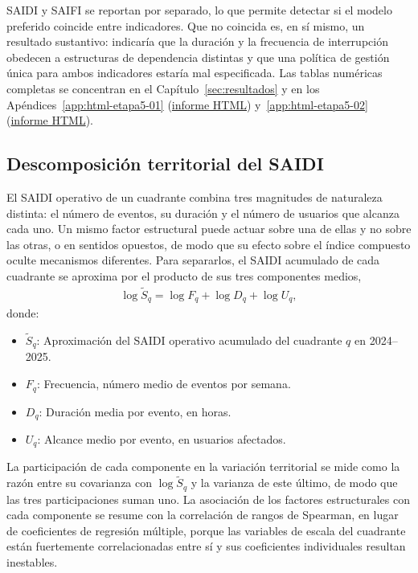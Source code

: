 SAIDI y SAIFI se reportan por separado, lo que permite detectar si el modelo preferido coincide entre indicadores. Que no coincida es, en sí mismo, un resultado sustantivo: indicaría que la duración y la frecuencia de interrupción obedecen a estructuras de dependencia distintas y que una política de gestión única para ambos indicadores estaría mal especificada. Las tablas numéricas completas se concentran en el Capítulo~\ref{sec:resultados} y en los Apéndices~\ref{app:html-etapa5-01} (\href{\urlEtapaCincoUno}{informe HTML}) y~\ref{app:html-etapa5-02} (\href{\urlEtapaCincoDos}{informe HTML}).

\subsection{Descomposición territorial del SAIDI}
\label{sec:descomposicion_saidi_met}
El SAIDI operativo de un cuadrante combina tres magnitudes de naturaleza distinta: el número de eventos, su duración y el número de usuarios que alcanza cada uno. Un mismo factor estructural puede actuar sobre una de ellas y no sobre las otras, o en sentidos opuestos, de modo que su efecto sobre el índice compuesto oculte mecanismos diferentes. Para separarlos, el SAIDI acumulado de cada cuadrante se aproxima por el producto de sus tres componentes medios,
\begin{equation}
    \begin{aligned}
    \log \tilde{S}_{q} = \log F_{q} + \log D_{q} + \log U_{q},
    \end{aligned}
    \label{eq:descomposicion_saidi}
\end{equation}
donde:
\begin{itemize}
    \item $\tilde{S}_{q}$: Aproximación del SAIDI operativo acumulado del cuadrante $q$ en 2024--2025.
    \item $F_{q}$: Frecuencia, número medio de eventos por semana.
    \item $D_{q}$: Duración media por evento, en horas.
    \item $U_{q}$: Alcance medio por evento, en usuarios afectados.
\end{itemize}
La participación de cada componente en la variación territorial se mide como la razón entre su covarianza con $\log \tilde{S}_{q}$ y la varianza de este último, de modo que las tres participaciones suman uno. La asociación de los factores estructurales con cada componente se resume con la correlación de rangos de Spearman, en lugar de coeficientes de regresión múltiple, porque las variables de escala del cuadrante están fuertemente correlacionadas entre sí y sus coeficientes individuales resultan inestables.

